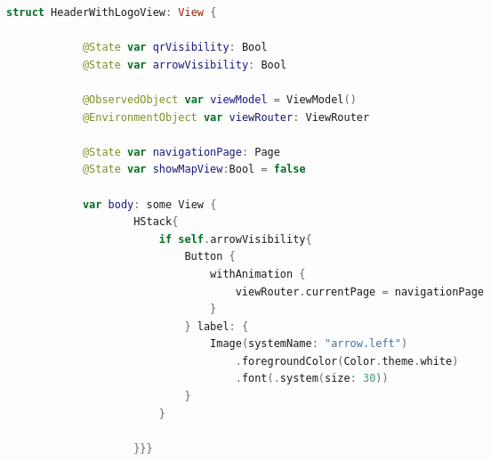 \begin{spacing}{2}
\end{spacing}
\begin{minipage}{\textwidth}
    \linespread{0.8}\selectfont
    \begin{lstlisting}[language=swift]
        struct HeaderWithLogoView: View {
            
            @State var qrVisibility: Bool
            @State var arrowVisibility: Bool
            
            @ObservedObject var viewModel = ViewModel()
            @EnvironmentObject var viewRouter: ViewRouter
            
            @State var navigationPage: Page
            @State var showMapView:Bool = false
            
            var body: some View {
                    HStack{
                        if self.arrowVisibility{
                            Button {
                                withAnimation {
                                    viewRouter.currentPage = navigationPage
                                }
                            } label: {
                                Image(systemName: "arrow.left")
                                    .foregroundColor(Color.theme.white)
                                    .font(.system(size: 30))
                            }
                        }
                        
                    }}}
    \end{lstlisting}   
\end{minipage}



